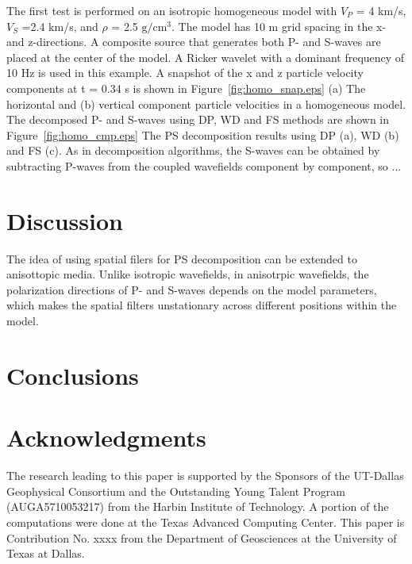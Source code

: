 \documentclass[manuscript,ulem,graphix,revised]{geophysics}
\begin{document}
The first test is performed on an isotropic homogeneous model with $V_P$ = 4 km/s, $V_S$ =2.4 km/s, and $\rho$ = 2.5 $\mathrm{g/cm^3}$. The model has 10 m grid spacing in the x- and z-directions. A composite source that generates both P- and S-waves are placed at the center of the model. A Ricker wavelet with a dominant frequency of 10 Hz is used in this example. A snapshot of the x and z particle velocity components at t = 0.34 s is shown in Figure~\ref{fig:homo_snap.eps}
{
(a) The horizontal and (b) vertical component particle velocities in a homogeneous model.
}
The decomposed P- and S-waves using DP, WD and FS methods are shown in Figure~\ref{fig:homo_cmp.eps}
{
The PS decomposition results using DP (a), WD (b) and FS (c).
}
As in decomposition algorithms, the S-waves can be obtained by subtracting P-waves from the coupled wavefields component by component, so ...


\section{Discussion}
\indent\indent
The idea of using spatial filers for PS decomposition can be extended to anisottopic media. Unlike isotropic wavefields, in anisotrpic wavefields, the polarization directions of P- and S-waves depends on the model parameters, which makes the spatial filters unstationary across different positions within the model. 



\section{Conclusions}



\section{Acknowledgments}

The research leading to this paper is supported by the Sponsors of the
UT-Dallas Geophysical Consortium and the Outstanding Young Talent Program (AUGA5710053217) from the Harbin Institute of Technology. A portion of the computations were done at the Texas Advanced Computing Center. This paper is Contribution No. xxxx
from the Department of Geosciences at the University of Texas at Dallas.



\newpage


\end{document}
